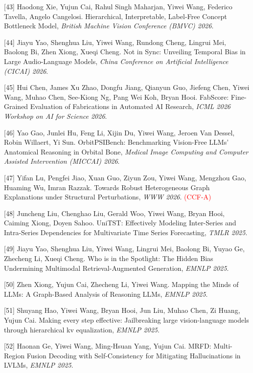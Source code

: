 [43] Haodong Xie, Yujun Cai, Rahul Singh Maharjan, Yiwei Wang, Federico Tavella, Angelo Cangelosi. Hierarchical, Interpretable, Label-Free Concept Bottleneck Model, \textit{British Machine Vision Conference (BMVC) 2026}.

[44] Jiayu Yao, Shenghua Liu, Yiwei Wang, Rundong Cheng, Lingrui Mei, Baolong Bi, Zhen Xiong, Xueqi Cheng. Not in Sync: Unveiling Temporal Bias in Large Audio-Language Models, \textit{China Conference on Artificial Intelligence (CICAI) 2026}.

[45] Hui Chen, James Xu Zhao, Dongfu Jiang, Qianyun Guo, Jiefeng Chen, Yiwei Wang, Muhao Chen, See-Kiong Ng, Pang Wei Koh, Bryan Hooi. FabScore: Fine-Grained Evaluation of Fabrications in Automated AI Research, \textit{ICML 2026 Workshop on AI for Science 2026}.

[46] Yao Gao, Junlei Hu, Feng Li, Xijin Du, Yiwei Wang, Jeroen Van Dessel, Robin Willaert, Yi Sun. OrbitPSIBench: Benchmarking Vision-Free LLMs’ Anatomical Reasoning in Orbital Bone, \textit{Medical Image Computing and Computer Assisted Intervention (MICCAI) 2026}.

[47] Yifan Lu, Pengfei Jiao, Xuan Guo, Ziyun Zou, Yiwei Wang, Mengzhou Gao, Huaming Wu, Imran Razzak. Towards Robust Heterogeneous Graph Explanations under Structural Perturbations, \textit{WWW 2026}. \textcolor{red}{(CCF-A)}

[48] Juncheng Liu, Chenghao Liu, Gerald Woo, Yiwei Wang, Bryan Hooi, Caiming Xiong, Doyen Sahoo. UniTST: Effectively Modeling Inter-Series and Intra-Series Dependencies for Multivariate Time Series Forecasting, \textit{TMLR 2025}.

[49] Jiayu Yao, Shenghua Liu, Yiwei Wang, Lingrui Mei, Baolong Bi, Yuyao Ge, Zhecheng Li, Xueqi Cheng. Who is in the Spotlight: The Hidden Bias Undermining Multimodal Retrieval-Augmented Generation, \textit{EMNLP 2025}.

[50] Zhen Xiong, Yujun Cai, Zhecheng Li, Yiwei Wang. Mapping the Minds of LLMs: A Graph-Based Analysis of Reasoning LLMs, \textit{EMNLP 2025}.

[51] Shuyang Hao, Yiwei Wang, Bryan Hooi, Jun Liu, Muhao Chen, Zi Huang, Yujun Cai. Making every step effective: Jailbreaking large vision-language models through hierarchical kv equalization, \textit{EMNLP 2025}.

[52] Haonan Ge, Yiwei Wang, Ming-Hsuan Yang, Yujun Cai. MRFD: Multi-Region Fusion Decoding with Self-Consistency for Mitigating Hallucinations in LVLMs, \textit{EMNLP 2025}.

